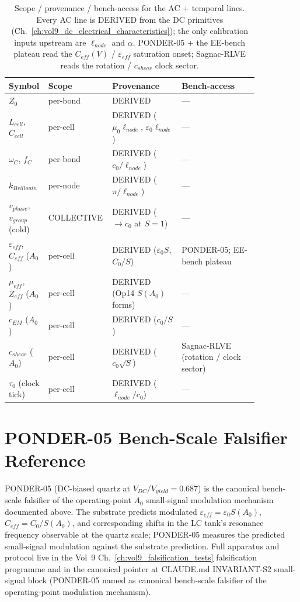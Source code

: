 \begin{table}[htbp]
\centering\footnotesize
\setlength{\tabcolsep}{5pt}
\begin{tabular}{@{}p{0.12\linewidth} p{0.16\linewidth} p{0.27\linewidth} p{0.30\linewidth}@{}}
\toprule
\textbf{Symbol} & \textbf{Scope} & \textbf{Provenance} & \textbf{Bench-access} \\
\midrule
$Z_0$ & per-bond & DERIVED & --- \\
$L_{cell}$, $C_{cell}$ & per-cell & DERIVED ($\mu_0\ell_{node}$, $\varepsilon_0\ell_{node}$) & --- \\
$\omega_C$, $f_C$ & per-bond & DERIVED ($c_0/\ell_{node}$) & --- \\
$k_{Brillouin}$ & per-node & DERIVED ($\pi/\ell_{node}$) & --- \\
$v_{phase}$, $v_{group}$ (cold) & COLLECTIVE & DERIVED ($\to c_0$ at $S=1$) & --- \\
$\varepsilon_{eff}$, $C_{eff}$ ($A_0$) & per-cell & DERIVED ($\varepsilon_0 S$, $C_0/S$) & PONDER-05; EE-bench plateau \\
$\mu_{eff}$, $Z_{eff}$ ($A_0$) & per-cell & DERIVED (Op14 $S(A_0)$ forms) & --- \\
$c_{EM}$ ($A_0$) & per-cell & DERIVED ($c_0/S$) & --- \\
$c_{shear}$ ($A_0$) & per-cell & DERIVED ($c_0\sqrt{S}$) & Sagnac-RLVE (rotation / clock sector) \\
$\tau_0$ (clock tick) & per-cell & DERIVED ($\ell_{node}/c_0$) & --- \\
\bottomrule
\end{tabular}
\caption{Scope / provenance / bench-access for the AC + temporal lines. Every AC line is DERIVED from the DC primitives (Ch.~\ref{ch:vol9_dc_electrical_characteristics}); the only calibration inputs upstream are $\ell_{node}$ and $\alpha$. PONDER-05 + the EE-bench plateau read the $C_{eff}(V)$ / $\varepsilon_{eff}$ saturation onset; Sagnac-RLVE reads the rotation / $c_{shear}$ clock sector.}
\label{tab:vol9_ac_scope}
\end{table}

\section{PONDER-05 Bench-Scale Falsifier Reference}
\label{sec:vol9_ponder05_reference}

PONDER-05 (DC-biased quartz at $V_{DC}/V_{yield} = 0.687$) is the canonical bench-scale falsifier of the operating-point $A_0$ small-signal modulation mechanism documented above. The substrate predicts modulated $\varepsilon_{eff} = \varepsilon_0 S(A_0)$, $C_{eff} = C_0/S(A_0)$, and corresponding shifts in the LC tank's resonance frequency observable at the quartz scale; PONDER-05 measures the predicted small-signal modulation against the substrate prediction. Full apparatus and protocol live in the Vol~9 Ch.~\ref{ch:vol9_falsification_tests} falsification programme and in the canonical pointer at CLAUDE.md INVARIANT-S2 small-signal block (PONDER-05 named as canonical bench-scale falsifier of the operating-point modulation mechanism).

